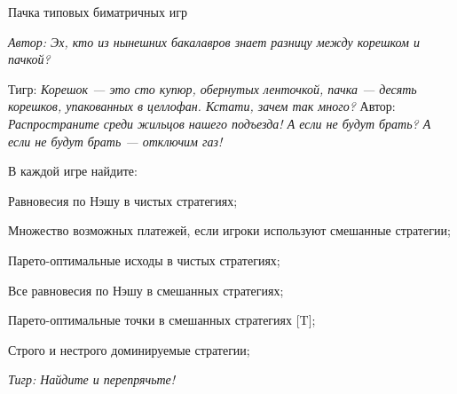 \begin{problem}
 Пачка типовых биматричных игр\par
{\it Автор:  Эх, кто из нынешних бакалавров знает разницу между корешком и пачкой?}\par
Тигр: {\it Корешок — это сто купюр, обернутых ленточкой, пачка — десять корешков, упакованных в целлофан. Кстати, зачем так много? }
Автор: {\it Распространите среди жильцов нашего подъезда! А если не будут брать? А если не будут брать — отключим газ!}

В каждой игре найдите: \par
Равновесия по Нэшу в чистых стратегиях;\par
Множество возможных платежей, если игроки используют смешанные стратегии;\par
Парето-оптимальные исходы в чистых стратегиях;\par
Все равновесия по Нэшу в смешанных стратегиях;\par
Парето-оптимальные точки в смешанных стратегиях [T];\par
Строго и нестрого доминируемые стратегии;\par
{\it Тигр: Найдите и перепрячьте!}\par


\end{problem}
